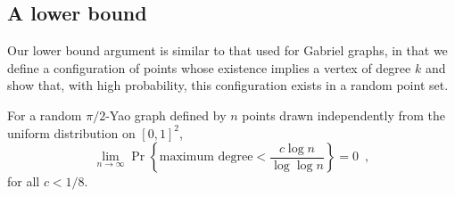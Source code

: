 \documentclass[lotsofwhite,charterfonts]{patmorin}
\begin{document}
\subsection{A lower bound}

Our lower bound argument is similar to that used for Gabriel graphs, in
that we define a configuration of points whose existence implies a vertex
of degree $k$ and show that, with high probability, this configuration
exists in a random point set.  

\begin{thm}
For a random $\pi/2$-Yao graph defined by $n$ points drawn independently
from the uniform distribution on $[0,1]^2$,
\[
   \lim_{n\rightarrow\infty}
     \Pr\left\{\mbox{maximum degree} < \frac{c\log n}{\log\log n} \right\} 
       = 0 \enspace ,
\]
for all $c < 1/8$.
\end{thm}
\end{document}
